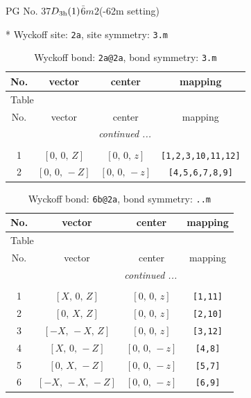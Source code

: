 \documentclass[fleqn,8pt]{jsarticle}
\begin{document}
\setcounter{MaxMatrixCols}{32}

\renewcommand{\tablename}{Table~}
\renewcommand{\figurename}{Figure~}
\begin{center}
\LARGE
PG No. 37\quad$D_{\rm 3h}(1)$\quad$\bar{6}m2$\quad(-62m setting)\quad[ hexagonal ]
\end{center}


* Wyckoff site: {\tt 2a}, site symmetry: {\tt 3.m}
\renewcommand{\arraystretch}{1.2}
\begin{longtable}{cccc}
\caption{Wyckoff bond: {\tt 2a@2a}, bond symmetry: {\tt 3.m}}
 \\
 \hline \hline
No. & vector & center & mapping \\ \hline \endfirsthead

\multicolumn{3}{l}{\tablename\ \thetable{}} \\
 \hline \hline
No. & vector & center & mapping \\ \hline \endhead

 \hline \hline
\multicolumn{3}{r}{\footnotesize\it continued ...} \\ \endfoot

 \hline \hline
\multicolumn{3}{r}{} \\ \endlastfoot

1 & $\left[ 0,\, 0,\, Z \right]$ & $\left[ 0,\, 0,\, z \right]$ & {\tt [1,2,3,10,11,12]} \\ \hline
2 & $\left[ 0,\, 0,\, - Z \right]$ & $\left[ 0,\, 0,\, - z \right]$ & {\tt [4,5,6,7,8,9]} \\
\end{longtable}
\renewcommand{\arraystretch}{1.2}
\begin{longtable}{cccc}
\caption{Wyckoff bond: {\tt 6b@2a}, bond symmetry: {\tt ..m}}
 \\
 \hline \hline
No. & vector & center & mapping \\ \hline \endfirsthead

\multicolumn{3}{l}{\tablename\ \thetable{}} \\
 \hline \hline
No. & vector & center & mapping \\ \hline \endhead

 \hline \hline
\multicolumn{3}{r}{\footnotesize\it continued ...} \\ \endfoot

 \hline \hline
\multicolumn{3}{r}{} \\ \endlastfoot

1 & $\left[ X,\, 0,\, Z \right]$ & $\left[ 0,\, 0,\, z \right]$ & {\tt [1,11]} \\ \hline
2 & $\left[ 0,\, X,\, Z \right]$ & $\left[ 0,\, 0,\, z \right]$ & {\tt [2,10]} \\ \hline
3 & $\left[ - X,\, - X,\, Z \right]$ & $\left[ 0,\, 0,\, z \right]$ & {\tt [3,12]} \\ \hline
4 & $\left[ X,\, 0,\, - Z \right]$ & $\left[ 0,\, 0,\, - z \right]$ & {\tt [4,8]} \\ \hline
5 & $\left[ 0,\, X,\, - Z \right]$ & $\left[ 0,\, 0,\, - z \right]$ & {\tt [5,7]} \\ \hline
6 & $\left[ - X,\, - X,\, - Z \right]$ & $\left[ 0,\, 0,\, - z \right]$ & {\tt [6,9]} \\
\end{longtable}
\end{document}
